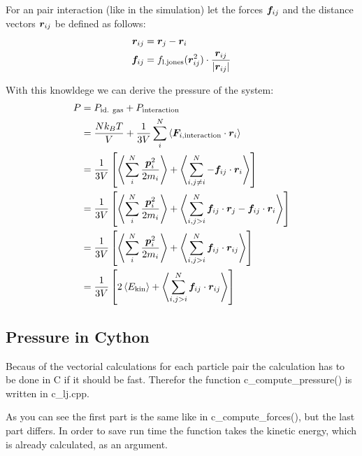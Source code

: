 For an pair interaction (like in the simulation) let the forces $\boldsymbol{f}_{ij}$ and the distance vectors $\boldsymbol{r}_{ij}$ be defined as follows:
\begin{align}
\boldsymbol{r}_{ij}
	&=\boldsymbol{r}_{j} - \boldsymbol{r}_{i}
	\label{4rij}\\
\boldsymbol{f}_{ij} 
	&= f_\text{l.jones}(\boldsymbol{r}_{ij}^2)\cdot\frac{\boldsymbol{r}_{ij}}{\left| \boldsymbol{r}_{ij}\right|}
	\label{4fij}
\end{align}

With this knowldege we can derive the pressure of the system:
\begin{align}
P
	&=P_\text{id. gas} + P_\text{interaction}
	\label{4p4}\\
	&=\frac{Nk_BT}{V} + \frac{1}{3V}\sum_i^N\left\langle\boldsymbol{F}_{i,\text{interaction}}\cdot\boldsymbol{r}_i\right\rangle
	\label{4p5}\\
	&=\frac{1}{3V}\left[\left\langle\sum_i^N\frac{\boldsymbol{p}_i^2}{2m_i}\right\rangle + \left\langle\sum_{i,j\neq i}^N-\boldsymbol{f}_{ij}\cdot\boldsymbol{r}_i\right\rangle\right]
	\label{4p6}\\
	&=\frac{1}{3V}\left[\left\langle\sum_i^N\frac{\boldsymbol{p}_i^2}{2m_i}\right\rangle + \left\langle\sum_{i,j>i}^N\boldsymbol{f}_{ij}\cdot\boldsymbol{r}_{j}-\boldsymbol{f}_{ij}\cdot\boldsymbol{r}_{i}\right\rangle\right]
	\label{4p7}\\
	&=\frac{1}{3V}\left[\left\langle\sum_i^N\frac{\boldsymbol{p}_i^2}{2m_i}\right\rangle + \left\langle\sum_{i,j>i}^N\boldsymbol{f}_{ij}\cdot\boldsymbol{r}_{ij}\right\rangle\right]
	\label{4p8}\\
	&=\frac{1}{3V}\left[ 2\left\langle E_\text{kin}\right\rangle + \left\langle\sum_{i,j>i}^N\boldsymbol{f}_{ij}\cdot\boldsymbol{r}_{ij}\right\rangle\right]
	\label{4p9}
\end{align}

\subsection*{Pressure in Cython}

Becaus of the vectorial calculations for each particle pair the calculation has to be done in C if it should be fast. 
Therefor the function c\_compute\_pressure() is written in c\_lj.cpp.


As you can see the first part is the same like in c\_compute\_forces(), but the last part differs.
In order to save run time the function takes the kinetic energy, which is already calculated, as an argument.